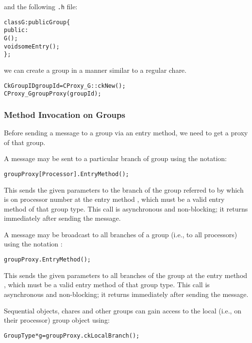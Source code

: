 and the following \texttt{.h} file:

\begin{alltt}
class G : public Group \{
  public:
    G();
    void someEntry();
\};
\end{alltt}

we can create a group in a manner similar to a regular
chare. 

\begin{alltt}
CkGroupID groupId = CProxy_G::ckNew();
CProxy_G groupProxy(groupId);
\end{alltt}

\subsubsection{Method Invocation on Groups}

Before sending a message to a group via an entry
method, we need to get a proxy of that group.

A message may be sent to a particular branch of group using the
notation:

\begin{alltt}
 groupProxy[Processor].EntryMethod();
\end{alltt}

This sends the given parameters to the branch of
the group referred to by  which is on processor number
 at the entry method , which must be a valid
entry method of that group type. This call is asynchronous and non-blocking; it
returns immediately after sending the message.

A message may be broadcast  to all branches of a group
(i.e., to all processors) using the notation :

\begin{alltt}
 groupProxy.EntryMethod();
\end{alltt}

This sends the given parameters to all branches of the group at
the entry method , which must be a valid entry method of that
group type. This call is asynchronous and non-blocking; it returns immediately
after sending the message.


Sequential objects, chares and other groups can gain access to the local
(i.e., on their processor) group object using:

\begin{alltt}
GroupType *g=groupProxy.ckLocalBranch();
\end{alltt}

